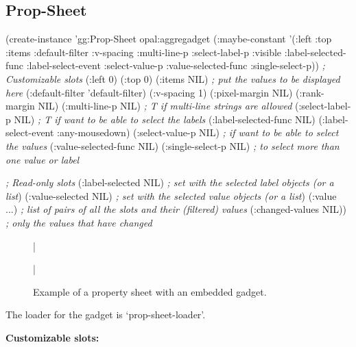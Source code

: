 \begin{group}
\subsection{Prop-Sheet}
\label{propsheetsec}

\begin{programexample}
(create-instance 'gg:Prop-Sheet opal:aggregadget
    (:maybe-constant '(:left :top :items :default-filter :v-spacing
		       :multi-line-p :select-label-p :visible
		       :label-selected-func :label-select-event
		       :select-value-p :value-selected-func :single-select-p))
   {\it ; Customizable slots}
    (:left 0) (:top 0)
    (:items NIL) {\it ; put the values to be displayed here}
    (:default-filter 'default-filter)
    (:v-spacing 1)
    (:pixel-margin NIL)
    (:rank-margin NIL)
    (:multi-line-p NIL) {\it ; T if multi-line strings are allowed}
    (:select-label-p NIL) {\it ; T if want to be able to select the labels}
    (:label-selected-func NIL)
    (:label-select-event :any-mousedown)
    (:select-value-p NIL) {\it ; if want to be able to select the values}
    (:value-selected-func NIL)
    (:single-select-p NIL) {\it ; to select more than one value or label}

   {\it ; Read-only slots}
    (:label-selected NIL) {\it ; set with the selected label objects (or a list})
    (:value-selected NIL) {\it ; set with the selected value objects (or a list})
    (:value ...)  {\it ; list of pairs of all the slots and their (filtered) values}
    (:changed-values NIL)) {\it ; only the values that have changed}
\end{programexample}
\end{group}

\begin{figure}
\bar{}
\begin{center}
\end{center}
\caption{Example of a property sheet with an embedded gadget.}
\bar{}
\end{figure}

The loader for the  gadget is `prop-sheet-loader'.

\vspace{1 line}

{\bf Customizable slots:}

